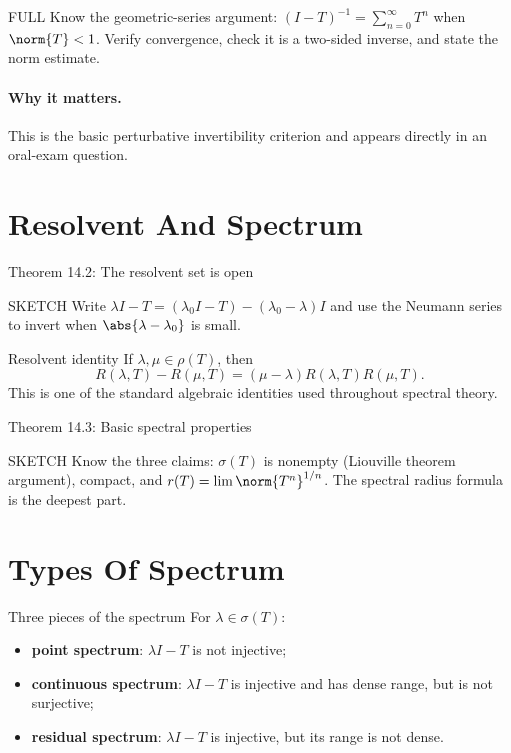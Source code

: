 \documentclass[header={Lecture 10 Exam Study Notes}]{study-note}
\begin{document}
\begin{prooflevelbox}{FULL}
Know the geometric-series argument: $(I-T)^{-1}=\sum_{n=0}^\infty T^n$ when $\norm{T}<1$. Verify convergence, check it is a two-sided inverse, and state the norm estimate.
\end{prooflevelbox}

\paragraph{Why it matters.}
This is the basic perturbative invertibility criterion and appears directly in an oral-exam question.

\section{Resolvent And Spectrum}

\begin{thmbox}{Theorem 14.2: The resolvent set is open}
\thmResolventAnalytic
\end{thmbox}

\begin{prooflevelbox}{SKETCH}
Write $\lambda I-T=(\lambda_0 I-T)-(\lambda_0-\lambda)I$ and use the Neumann series to invert when $\abs{\lambda-\lambda_0}$ is small.
\end{prooflevelbox}

\begin{thmbox}{Resolvent identity}
If $\lambda,\mu\in\rho(T)$, then
\[
R(\lambda,T)-R(\mu,T)=(\mu-\lambda)R(\lambda,T)R(\mu,T).
\]
This is one of the standard algebraic identities used throughout spectral theory.
\end{thmbox}

\begin{thmbox}{Theorem 14.3: Basic spectral properties}
\thmSpectralRadius
\end{thmbox}

\begin{prooflevelbox}{SKETCH}
Know the three claims: $\sigma(T)$ is nonempty (Liouville theorem argument), compact, and $r(T)=\lim\norm{T^n}^{1/n}$. The spectral radius formula is the deepest part.
\end{prooflevelbox}

\section{Types Of Spectrum}

\begin{defbox}{Three pieces of the spectrum}
For $\lambda\in\sigma(T)$:
\begin{itemize}
\item \textbf{point spectrum}: $\lambda I-T$ is not injective;
\item \textbf{continuous spectrum}: $\lambda I-T$ is injective and has dense range, but is not surjective;
\item \textbf{residual spectrum}: $\lambda I-T$ is injective, but its range is not dense.
\end{itemize}
\end{defbox}
\end{document}
